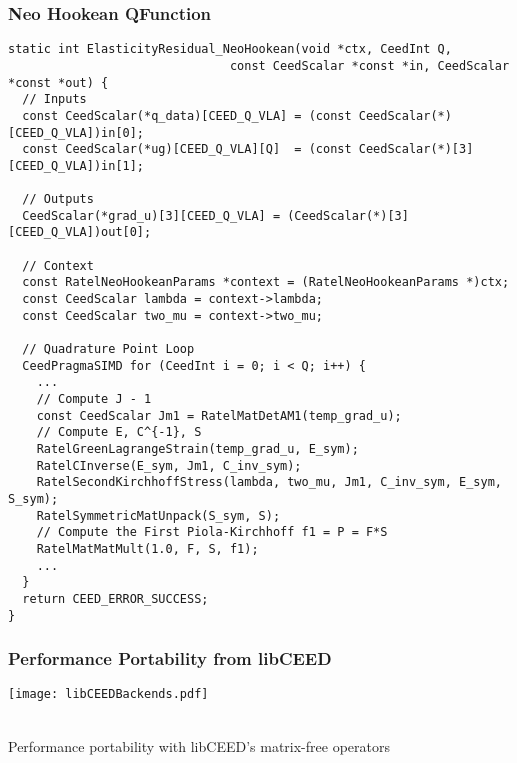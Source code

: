 \documentclass{beamer}
\begin{document}

\begin{frame}[fragile]
\begin{center}
\frametitle{Neo Hookean QFunction}

{\tiny
\begin{lstlisting}[style=boxedC]
static int ElasticityResidual_NeoHookean(void *ctx, CeedInt Q,
                               const CeedScalar *const *in, CeedScalar *const *out) {
  // Inputs
  const CeedScalar(*q_data)[CEED_Q_VLA] = (const CeedScalar(*)[CEED_Q_VLA])in[0];
  const CeedScalar(*ug)[CEED_Q_VLA][Q]  = (const CeedScalar(*)[3][CEED_Q_VLA])in[1];

  // Outputs
  CeedScalar(*grad_u)[3][CEED_Q_VLA] = (CeedScalar(*)[3][CEED_Q_VLA])out[0];

  // Context
  const RatelNeoHookeanParams *context = (RatelNeoHookeanParams *)ctx;
  const CeedScalar lambda = context->lambda;
  const CeedScalar two_mu = context->two_mu;

  // Quadrature Point Loop
  CeedPragmaSIMD for (CeedInt i = 0; i < Q; i++) {
    ...
    // Compute J - 1
    const CeedScalar Jm1 = RatelMatDetAM1(temp_grad_u);
    // Compute E, C^{-1}, S
    RatelGreenLagrangeStrain(temp_grad_u, E_sym);
    RatelCInverse(E_sym, Jm1, C_inv_sym);
    RatelSecondKirchhoffStress(lambda, two_mu, Jm1, C_inv_sym, E_sym, S_sym);
    RatelSymmetricMatUnpack(S_sym, S);
    // Compute the First Piola-Kirchhoff f1 = P = F*S
    RatelMatMatMult(1.0, F, S, f1);
    ...
  }
  return CEED_ERROR_SUCCESS;
}
\end{lstlisting}
}

\end{center}
\end{frame}


\begin{frame}
\begin{center}
\frametitle{Performance Portability from libCEED}

\texttt{[image: libCEEDBackends.pdf]}

~\\

Performance portability with libCEED's matrix-free operators\\

\end{center}
\end{frame}
\end{document}
